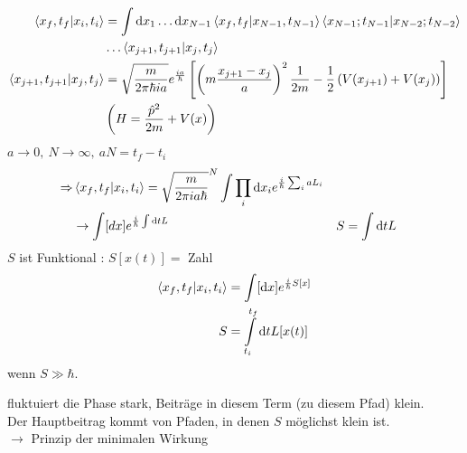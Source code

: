 	\begin{align*}
		\braket{x_f, t_f | x_i , t_i} &=
		\int \mathrm{d} x_1 \ldots \mathrm{d} x_{N-1} 
		\braket{x_f, t_f | x_{N-1}, t_{N-1}} 
		\braket{x_{N-1}; t_{N-1}| x_{N-2};t_{N-2}} \\
		&\ldots
		\braket{x_{j+1}, t_{j+1}| x_j, t_j} \\
		\braket{x_{j+1},t_{j+1} | x_j, t_j}
		&= \sqrt{\frac{m}{2\pi\hbar ia}} e^{\frac{ia}{\hbar}} 
		\left[
			\left(m \frac{x_{j+1} - x_j}{a}\right)^2 \frac{1}{2 m}
			-\frac{1}{2} \left(V(x_{j+1}) + V(x_j)\right)
		\right] \\
		&\left(H = \frac{\hat{p}^2}{2m} + V(x)\right) 
	\end{align*}
$a \rightarrow 0,~ N \rightarrow \infty,~ aN = t_f - t_i$
	\begin{align*}
		\Rightarrow& \braket{x_f,t_f | x_i,t_i} =
		\sqrt{\frac{m}{2 \pi i a \hbar}}^N 
		\int \prod_i \mathrm{d} x_i e^{\frac{i}{\hbar} \sum_i a L_i} \\
		&\rightarrow \int [dx] e^{\frac{i}{\hbar} \int \mathrm{d} t L} 
		& S &= \int \mathrm{d} t L
	\end{align*}
$S$ ist Funktional : $S[x(t)] = $ Zahl
	\begin{align*}
		\braket{x_f,t_f | x_i,t_i} &= \int [\mathrm{d} x] e^{\frac{i}{\hbar} S[x]} \\
		S &= \int \limits_{t_i}^{t_f} \mathrm{d} t L[x(t)]
	\end{align*} 
wenn $S \gg \hbar$.

fluktuiert die Phase stark, Beiträge in diesem Term (zu diesem Pfad) klein.
\\
Der Hauptbeitrag kommt von Pfaden, in denen $S$ möglichst klein ist. 
\\
$\rightarrow$ Prinzip der minimalen Wirkung

